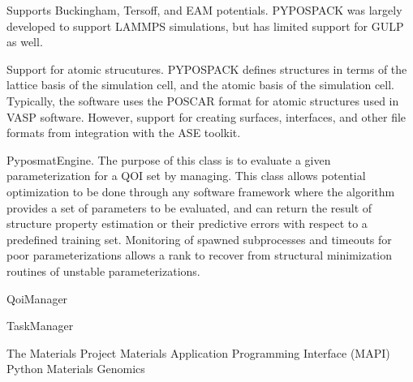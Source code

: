 Supports Buckingham, Tersoff, and EAM potentials.  PYPOSPACK was largely developed to support LAMMPS simulations, but has limited support for GULP as well.

Support for atomic strucutures.  PYPOSPACK defines structures in terms of the lattice basis of the simulation cell, and the atomic basis of the simulation cell.  Typically, the software uses the POSCAR format for atomic structures used in VASP software.  However, support for creating surfaces, interfaces, and other file formats from integration with the ASE toolkit.

PyposmatEngine.  The purpose of this class is to evaluate a given parameterization for a QOI set by managing.  This class allows potential optimization to be done through any software framework where the algorithm provides a set of parameters to be evaluated, and can return the result of structure property estimation or their predictive errors with respect to a predefined training set.  Monitoring of spawned subprocesses and timeouts for poor parameterizations allows a rank to recover from structural minimization routines of unstable parameterizations.

QoiManager

TaskManager


The Materials Project\cite{Jain2013_materialsproject}
Materials Application Programming Interface (MAPI) \cite{ong2015_mapi}
Python Materials Genomics\cite{ong2013_pymatgen}

